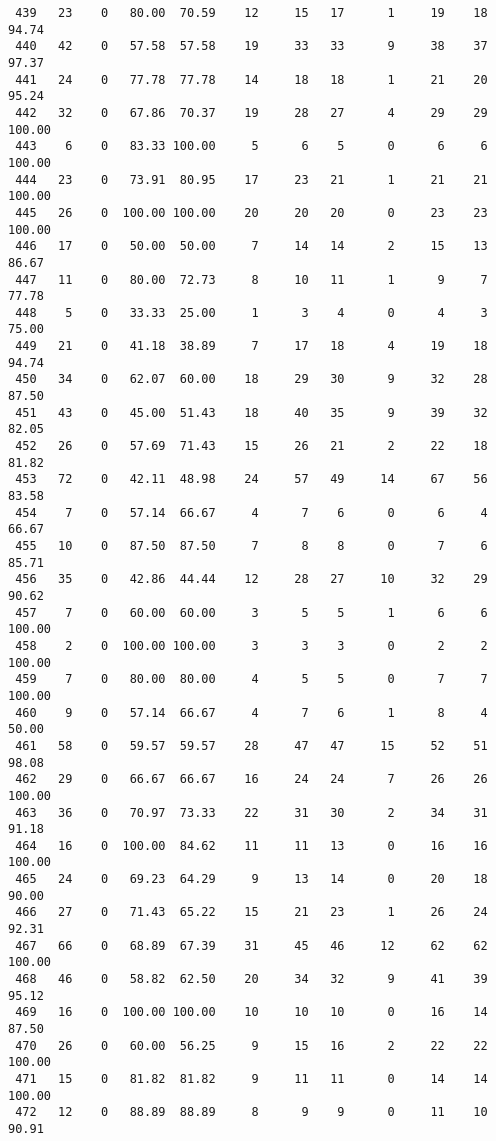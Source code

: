\begin{verbatim}
 439   23    0   80.00  70.59    12     15   17      1     19    18    94.74
 440   42    0   57.58  57.58    19     33   33      9     38    37    97.37
 441   24    0   77.78  77.78    14     18   18      1     21    20    95.24
 442   32    0   67.86  70.37    19     28   27      4     29    29   100.00
 443    6    0   83.33 100.00     5      6    5      0      6     6   100.00
 444   23    0   73.91  80.95    17     23   21      1     21    21   100.00
 445   26    0  100.00 100.00    20     20   20      0     23    23   100.00
 446   17    0   50.00  50.00     7     14   14      2     15    13    86.67
 447   11    0   80.00  72.73     8     10   11      1      9     7    77.78
 448    5    0   33.33  25.00     1      3    4      0      4     3    75.00
 449   21    0   41.18  38.89     7     17   18      4     19    18    94.74
 450   34    0   62.07  60.00    18     29   30      9     32    28    87.50
 451   43    0   45.00  51.43    18     40   35      9     39    32    82.05
 452   26    0   57.69  71.43    15     26   21      2     22    18    81.82
 453   72    0   42.11  48.98    24     57   49     14     67    56    83.58
 454    7    0   57.14  66.67     4      7    6      0      6     4    66.67
 455   10    0   87.50  87.50     7      8    8      0      7     6    85.71
 456   35    0   42.86  44.44    12     28   27     10     32    29    90.62
 457    7    0   60.00  60.00     3      5    5      1      6     6   100.00
 458    2    0  100.00 100.00     3      3    3      0      2     2   100.00
 459    7    0   80.00  80.00     4      5    5      0      7     7   100.00
 460    9    0   57.14  66.67     4      7    6      1      8     4    50.00
 461   58    0   59.57  59.57    28     47   47     15     52    51    98.08
 462   29    0   66.67  66.67    16     24   24      7     26    26   100.00
 463   36    0   70.97  73.33    22     31   30      2     34    31    91.18
 464   16    0  100.00  84.62    11     11   13      0     16    16   100.00
 465   24    0   69.23  64.29     9     13   14      0     20    18    90.00
 466   27    0   71.43  65.22    15     21   23      1     26    24    92.31
 467   66    0   68.89  67.39    31     45   46     12     62    62   100.00
 468   46    0   58.82  62.50    20     34   32      9     41    39    95.12
 469   16    0  100.00 100.00    10     10   10      0     16    14    87.50
 470   26    0   60.00  56.25     9     15   16      2     22    22   100.00
 471   15    0   81.82  81.82     9     11   11      0     14    14   100.00
 472   12    0   88.89  88.89     8      9    9      0     11    10    90.91

\end{verbatim}
